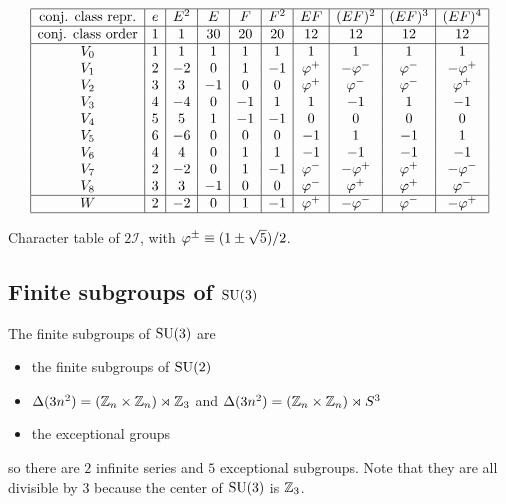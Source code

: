             \begin{table}[H]
                \centering
                {\small
                \begin{equation*}
                        \begin{array}{|c|c|c|c|c|c|c|c|c|c|}
                            \hline
                            \text{conj. class repr.} & e & E^2 & E & F & F^2 & EF & (EF)^2 & (EF)^3 & (EF)^4 \\ \hline
                            \text{conj. class order} & 1 & 1 & 30 & 20 & 20 & 12 & 12 & 12 & 12\\
                            \hline
                            V_0 & 1 & 1 & 1 & 1 & 1 & 1 & 1 & 1 & 1 \\
                            V_1 & 2 & -2 & 0 & 1 & -1 & \varphi^+ & -\varphi^- & \varphi^- & -\varphi^+ \\
                            V_2 & 3 & 3 & -1 & 0 & 0 & \varphi^+ & \varphi^- & \varphi^- & \varphi^+ \\
                            V_3 & 4 & -4 & 0 & -1 & 1 & 1 & -1 & 1 & -1 \\
                            V_4 & 5 & 5 & 1 & -1 & -1 & 0 & 0 & 0 & 0 \\
                            V_5 & 6 & -6 & 0 & 0 & 0 & -1 & 1 & -1 & 1 \\
                            V_6 & 4 & 4 & 0 & 1 & 1 & -1 & -1 & -1 & -1 \\
                            V_7 & 2 & -2 & 0 & 1 & -1 & \varphi^- & -\varphi^+ & \varphi^+ & -\varphi^- \\
                            V_8 & 3 & 3 & -1 & 0 & 0 & \varphi^- & \varphi^+ & \varphi^+ & \varphi^- \\ \hline
                            W & 2 & -2 & 0 & 1 & -1 & \varphi^+ & -\varphi^- & \varphi^- & -\varphi^+ \\ \hline
                        \end{array}
                    \end{equation*}}
                \caption{Character table of $2\mathcal{I}$, with $\varphi^\pm\equiv(1\pm\sqrt{5})/2$.}
            \end{table}


    \subsection{Finite subgroups of $\text{SU}(3)$}

        The finite subgroups of $\text{SU}(3)$ are
        \begin{itemize}
            \item the finite subgroups of $\text{SU}(2)$
            \item $\Delta(3n^2)=(\mathbb{Z}_n\times\mathbb{Z}_n)\rtimes\mathbb{Z}_3$ and $\Delta(3n^2)=(\mathbb{Z}_n\times\mathbb{Z}_n)\rtimes S^3$
            \item the exceptional groups
        \end{itemize}
        so there are $2$ infinite series and $5$ exceptional subgroups. Note that they are all divisible by $3$ because the center of $\text{SU}(3)$ is $\mathbb{Z}_3$.

